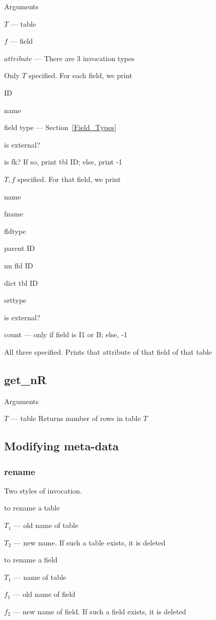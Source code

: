 \documentclass{report}
\begin{document}
Arguments
\be
\item \(T\) --- table
\item \(f\) --- field 
\item \(attribute\) --- 
\ee
There are 3 invocation types
\be
\item Only \(T\) specified.  For each field, we print
\be
\item ID
\item name
\item field type --- Section~\ref{Field_Types}
\item is external?
\item is fk? If so, print tbl ID; else, print -1
\ee
\item \(T, f\) specified. For that field, we print
\be
\item name
\item fname
\item fldtype
\item parent ID
\item nn fld ID 
\item dict tbl ID 
\item srttype
\item is external?
\item count --- only if field is I1 or B; else, -1 
\ee

\item All three specified. Prints that attribute of that field of that
table
\ee

\subsection{get\_nR}
\label{get_nR}
Arguments
\be
\item \(T\) --- table
\ee
Returns number of rows in table \(T\)


\subsection{Modifying meta-data}
\subsubsection{rename}
\label{rename}
Two styles of invocation. 
\be
\item to rename a table 
\be
\item \(T_1\) --- old name of table
\item \(T_2\) --- new name. If such a table exists, it is deleted
\ee
\item to rename a field 
\be
\item \(T_1\) --- name of table
\item \(f_1\) --- old name of field 
\item \(f_2\) --- new name of field. If such a field exists, it is
deleted
\ee
\ee
\end{document}
